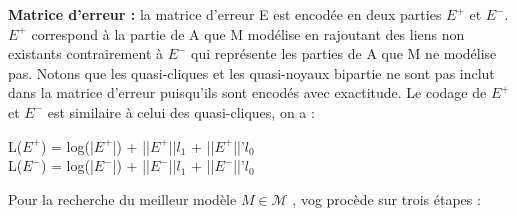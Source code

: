 \textbf{Matrice d'erreur :} la matrice d'erreur E est encodée en deux parties $E^{+}$ et $E^{-}$. $E^{+}$  correspond à la partie de A que M modélise en rajoutant des liens non existants contrairement à $E^{-}$ qui représente les parties de A que M ne modélise pas. Notons que les quasi-cliques et les quasi-noyaux bipartie ne sont pas inclut dans la matrice d'erreur puisqu'ils sont encodés avec exactitude. Le codage de $E^{+}$ et $E^{-}$ est similaire à celui des quasi-cliques, on a :
\begin{center}
L(${E}^{+}$) = log(|${E}^{+}$|) + ||${E}^{+}$||\textit{$l_{1}$} + ||${E}^{+}$||'\textit{$l_{0}$}\\
L(${E}^{-}$) = log(|${E}^{-}$|) + ||${E}^{-}$||\textit{$l_{1}$} + ||${E}^{-}$||'\textit{$l_{0}$}\\
\end{center} 
Pour la recherche du meilleur modèle $ \textit{M} \in \mathcal{M} $ , \gls{vog} procède sur trois étapes :
